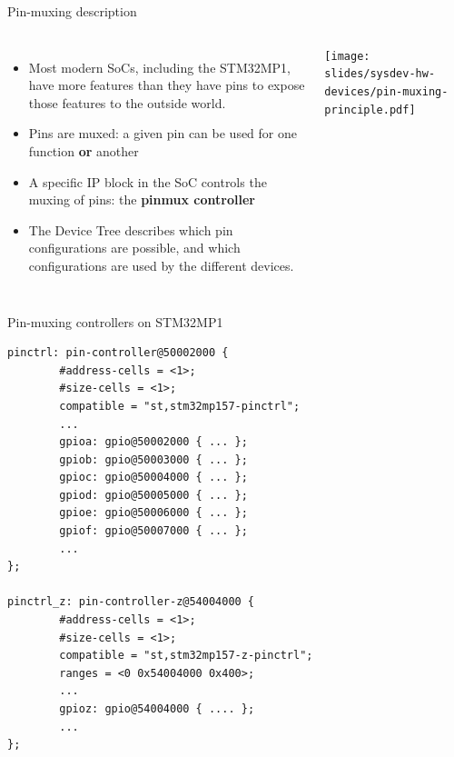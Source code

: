 \begin{frame}{Pin-muxing description}
  \begin{columns}
    \begin{itemize}
    \item Most modern SoCs, including the STM32MP1, have more features
      than they have pins to expose those features to the outside world.
    \item Pins are muxed: a given pin can be used for one function
      {\bf or} another
    \item A specific IP block in the SoC controls the muxing of pins:
      the {\bf pinmux controller}
    \item The Device Tree describes which pin configurations are
      possible, and which configurations are used by the different
      devices.
    \end{itemize}
    \texttt{[image: slides/sysdev-hw-devices/pin-muxing-principle.pdf]}
  \end{columns}
\end{frame}

\begin{frame}[fragile]{Pin-muxing controllers on STM32MP1}
  \begin{block}{}
{\tiny
\begin{verbatim}
pinctrl: pin-controller@50002000 {
        #address-cells = <1>;
        #size-cells = <1>;
        compatible = "st,stm32mp157-pinctrl";
        ...
        gpioa: gpio@50002000 { ... };
        gpiob: gpio@50003000 { ... };
        gpioc: gpio@50004000 { ... };
        gpiod: gpio@50005000 { ... };
        gpioe: gpio@50006000 { ... };
        gpiof: gpio@50007000 { ... };
        ...
};

pinctrl_z: pin-controller-z@54004000 {
        #address-cells = <1>;
        #size-cells = <1>;
        compatible = "st,stm32mp157-z-pinctrl";
        ranges = <0 0x54004000 0x400>;
        ...
        gpioz: gpio@54004000 { .... };
        ...
};
\end{verbatim}
}
  \end{block}
\end{frame}

